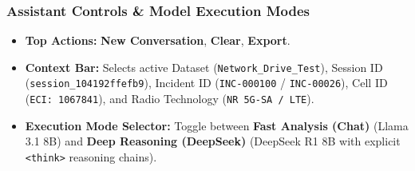 \documentclass[12pt,a4paper]{article}
\begin{document}
\subsubsection{Assistant Controls \& Model Execution Modes}
\begin{itemize}
    \item \textbf{Top Actions:} \textbf{New Conversation}, \textbf{Clear}, \textbf{Export}.
    \item \textbf{Context Bar:} Selects active Dataset (\texttt{Network\_Drive\_Test}), Session ID (\texttt{session\_104192ffefb9}), Incident ID (\texttt{INC-000100} / \texttt{INC-00026}), Cell ID (\texttt{ECI: 1067841}), and Radio Technology (\texttt{NR 5G-SA / LTE}).
    \item \textbf{Execution Mode Selector:} Toggle between \textbf{Fast Analysis (Chat)} (Llama 3.1 8B) and \textbf{Deep Reasoning (DeepSeek)} (DeepSeek R1 8B with explicit \texttt{<think>} reasoning chains).
\end{itemize}
\end{document}
